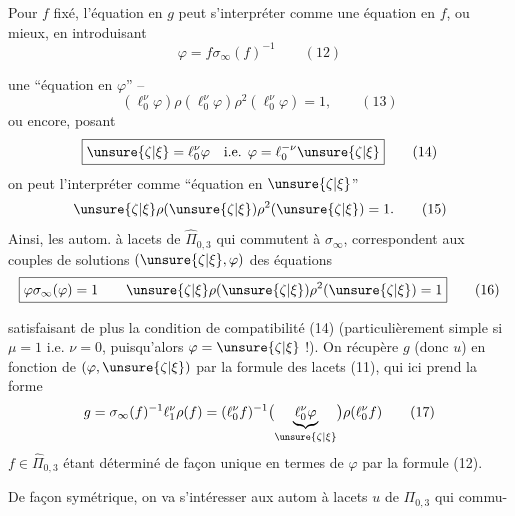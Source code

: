 
Pour $f$ fixé, l'équation en $g$ peut s'interpréter comme une équation en $f$, ou mieux, en introduisant
\[
\varphi=f\sigma_\infty(f)^{-1}
\qquad (12)
\]



une ``équation en $\varphi$'' --
\[
(\ell_0^\nu\varphi)\rho(\ell_0^\nu\varphi)\rho^2(\ell_0^\nu\varphi)=1,
\qquad (13)
\]
ou encore, posant
\[
\boxed{\unsure{\zeta|\xi}=\ell_0^\nu\varphi\quad\text{i.e. }\varphi=\ell_0^{-\nu}\unsure{\zeta|\xi}}
\qquad (14)
\]
on peut l'interpréter comme ``équation en $\unsure{\zeta|\xi}$''
\[
\unsure{\zeta|\xi}\rho(\unsure{\zeta|\xi})\rho^2(\unsure{\zeta|\xi})=1.
\qquad (15)
\]
Ainsi, les autom. à lacets de $\widehat{\Pi}_{0,3}$ qui commutent à $\sigma_\infty$,  correspondent aux couples de solutions $(\unsure{\zeta|\xi},\varphi)$ des équations
\[
\boxed{\varphi\sigma_\infty(\varphi)=1\qquad
\unsure{\zeta|\xi}\rho(\unsure{\zeta|\xi})\rho^2(\unsure{\zeta|\xi})=1}
\qquad (16)
\]


satisfaisant de plus la condition de compatibilité (14) (particulièrement simple  si $\mu=1$ i.e. \deleted{$\mu=$} $\nu=0$, puisqu'alors $\varphi=\unsure{\zeta|\xi}$ !). On récupère $g$ (donc $u$)  en fonction
de $(\varphi,\unsure{\zeta|\xi})$ par la formule des lacets (11), qui ici prend la forme
\[
g=\sigma_\infty(f)^{-1}\ell_1^\nu\rho(f)
=(\ell_0^\nu f)^{-1}\bigl(\underbrace{\ell_0^\nu\varphi}_{\unsure{\zeta|\xi}}\bigr)\rho(\ell_0^\nu f)
\qquad (17)
\]
$f\in\widehat{\Pi}_{0,3}$ étant déterminé de façon unique en termes de $\varphi$ par la formule (12).

De façon symétrique, on va s'intéresser aux autom à lacets $u$ de $\Pi_{0,3}$ qui commu-



